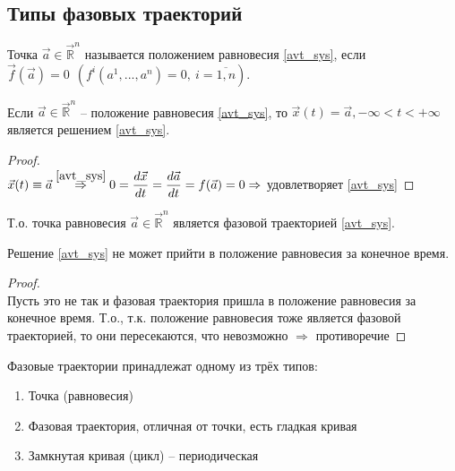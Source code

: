 \subsection{Типы фазовых траекторий}

\begin{definition}
	Точка $\vec{a} \in \vec{\mathbb{R}}^n$ называется положением равновесия \eqref{avt_sys}, если \\ $ \vec{f}(\vec{a}) = 0 \ \ (f^i(a^1, ..., a^n) = 0, \ i = \overline{1, n} )$.
\end{definition}

\begin{proposition}
	Если $ \vec{a} \in \vec{\mathbb{R}}^n $ -- положение равновесия \eqref{avt_sys}, то $ \vec{x}(t) = \vec{a}, -\infty < t < + \infty$ является решением \eqref{avt_sys}.
\end{proposition}

\begin{proof}
	\ \\
	$\vec{x}(t) \equiv \vec{a} \overset{\eqref{avt_sys}}{\Rightarrow} 0 = \dfrac{d\vec{x}}{dt} = \dfrac{d \vec{a}}{dt} = f(\vec{a}) = 0 \Rightarrow$ удовлетворяет \eqref{avt_sys}
\end{proof}
\noindent Т.о. точка равновесия $ \vec{a} \in \vec{\mathbb{R}}^n$ является фазовой траекторией \eqref{avt_sys}.

\begin{corollary}
	Решение \eqref{avt_sys} не может прийти в положение равновесия за конечное время.
\end{corollary}

\begin{proof}
	\ \\
	Пусть это не так и фазовая траектория пришла в положение равновесия за конечное время. Т.о., т.к. положение равновесия тоже является фазовой траекторией, то они пересекаются, что невозможно $\Rightarrow$ противоречие 
\end{proof}

\begin{theorem}
	Фазовые траектории принадлежат одному из трёх типов:
	\begin{enumerate}
		\item Точка (равновесия)
		\item Фазовая траектория, отличная от точки, есть гладкая кривая
		\item Замкнутая кривая (цикл) -- периодическая
	\end{enumerate}
\end{theorem}
